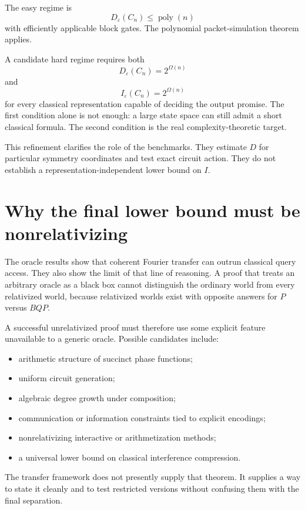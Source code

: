 \documentclass[11pt]{article}
\begin{document}
The easy regime is
\[
        D_\varepsilon(C_n)\le\operatorname{poly}(n)
\]
with efficiently applicable block gates.  The polynomial packet-simulation theorem applies.

A candidate hard regime requires both
\[
        D_\varepsilon(C_n)=2^{\Omega(n)}
\]
and
\[
        I_\varepsilon(C_n)=2^{\Omega(n)}
\]
for every classical representation capable of deciding the output promise.  The first condition alone is not enough: a large state space can still admit a short classical formula.  The second condition is the real complexity-theoretic target.

This refinement clarifies the role of the benchmarks.  They estimate $D$ for particular symmetry coordinates and test exact circuit action.  They do not establish a representation-independent lower bound on $I$.

\section{Why the final lower bound must be nonrelativizing}

The oracle results show that coherent Fourier transfer can outrun classical query access.  They also show the limit of that line of reasoning.  A proof that treats an arbitrary oracle as a black box cannot distinguish the ordinary world from every relativized world, because relativized worlds exist with opposite answers for $P$ versus $BQP$.

A successful unrelativized proof must therefore use some explicit feature unavailable to a generic oracle.  Possible candidates include:
\begin{itemize}
\item arithmetic structure of succinct phase functions;
\item uniform circuit generation;
\item algebraic degree growth under composition;
\item communication or information constraints tied to explicit encodings;
\item nonrelativizing interactive or arithmetization methods;
\item a universal lower bound on classical interference compression.
\end{itemize}

The transfer framework does not presently supply that theorem.  It supplies a way to state it cleanly and to test restricted versions without confusing them with the final separation.
\end{document}
